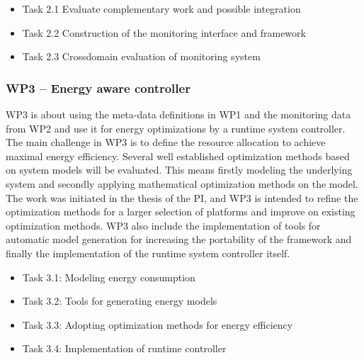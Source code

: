 \documentclass{article}
\begin{document}
\begin{itemize}
\item Task 2.1 Evaluate complementary work and possible integration \vspace{-0.3cm}
\item Task 2.2 Construction of the monitoring interface and framework \vspace{-0.3cm}
\item Task 2.3 Crossdomain evaluation of monitoring system
\end{itemize}

\subsubsection{WP3 -- Energy aware controller}
WP3 is about using the meta-data definitions in WP1 and the monitoring data from WP2 and use it for energy optimizations by a runtime system controller.
The main challenge in WP3 is to define the resource allocation to achieve maximal energy efficiency.
Several well established optimization methods based on system models will be evaluated.
This means firstly modeling the underlying system and secondly applying mathematical optimization methods on the model.
The work was initiated in the thesis of the PI, and WP3 is intended to refine the optimization methods for a larger selection of platforms and improve on existing optimization methods.
WP3 also include the implementation of tools for automatic model generation for increasing the portability of the framework and finally the implementation of the runtime system controller itself.
\begin{itemize}
 \item Task 3.1: Modeling energy consumption \vspace{-0.3cm}
 \item Task 3.2: Tools for generating energy models \vspace{-0.3cm}
 \item Task 3.3: Adopting optimization methods for energy efficiency \vspace{-0.3cm}
 \item Task 3.4: Implementation of runtime controller
\end{itemize}
\end{document}
